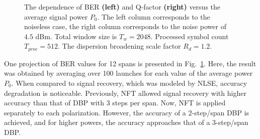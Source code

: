 \begin{figure}[tpb]
\begin{minipage}[h]{0.5\linewidth}
{    }
    \end{minipage}
    \caption{The dependence of BER \textbf{(left)} and Q-factor \textbf{(right)} versus the average signal power $P_0$. The left column corresponds to the noiseless case, the right column corresponds to the noise power of $4.5$ dBm. Total window size is $T_w=2048$. Processed symbol count $T_{proc} = 512$. The dispersion broadening scale factor $R_d=1.2$.}
    \label{fig:noise_ME}
\end{figure}

One projection of BER values for 12 spans is presented in Fig.~\ref{fig:noise_ME}. Here, the result was obtained by averaging over 100 launches for each value of the average power $P_0$. When compared to signal recovery, which was modeled by NLSE, accuracy degradation is noticeable. Previously, NFT allowed signal recovery with higher accuracy than that of DBP with 3 steps per span. Now, NFT is applied separately to each polarization. However, the accuracy of a 2-step/span DBP is achieved, and for higher powers, the accuracy approaches that of a 3-step/span DBP.


